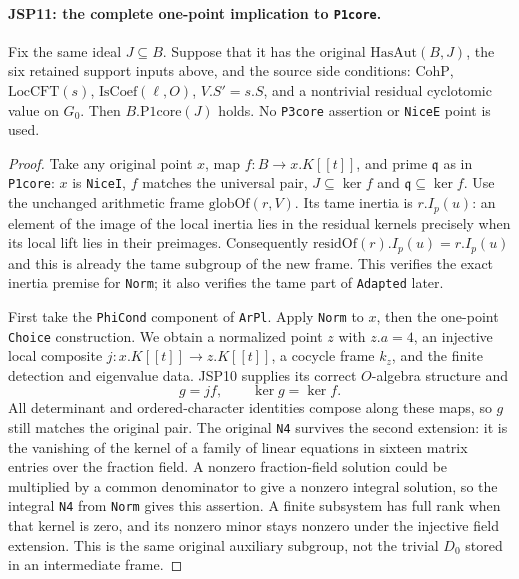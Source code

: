 \paragraph{JSP11: the complete one-point implication to \texttt{P1core}.}
\label{claim:JSP11}
Fix the same ideal $J\subseteq B$. Suppose that it has the
original $\mathrm{HasAut}(B,J)$, the six retained support
inputs above, and the source side conditions:
$\mathrm{CohP}$, $\mathrm{LocCFT}(s)$, $\mathrm{IsCoef}(\ell,O)$,
$V.S'=s.S$, and a nontrivial residual cyclotomic value on $G_0$.
Then $B.\mathrm{P1core}(J)$ holds. No \texttt{P3core}
assertion or \texttt{NiceE} point is used.
\begin{proof}
Take any original point $x$, map $f:B\to x.K[[t]]$, and
prime $\mathfrak q$ as in \texttt{P1core}: $x$ is
\texttt{NiceI}, $f$ matches the universal pair,
$J\subseteq\ker f$ and $\mathfrak q\subseteq\ker f$.
Use the unchanged arithmetic frame $\mathrm{globOf}(r,V)$.
Its tame inertia is $r.I_p(u)$: an element of the image of
the local inertia lies in the residual kernels precisely when
its local lift lies in their preimages. Consequently
$\mathrm{residOf}(r).I_p(u)=r.I_p(u)$ and this is already
the tame subgroup of the new frame. This verifies the exact
inertia premise for \texttt{Norm}; it also verifies the tame
part of \texttt{Adapted} later.

First take the \texttt{PhiCond} component of \texttt{ArPl}.
Apply \texttt{Norm} to $x$, then the one-point
\texttt{Choice} construction. We obtain a normalized point
$z$ with $z.a=4$, an injective local composite
$j:x.K[[t]]\to z.K[[t]]$, a cocycle frame $k_z$, and the
finite detection and eigenvalue data. JSP10 supplies its
correct $O$-algebra structure and
\[
                         g=jf,\qquad \ker g=\ker f.   \tag{JSP.17}
\]
All determinant and ordered-character identities compose
along these maps, so $g$ still matches the original pair.
The original \texttt{N4} survives the second extension:
it is the vanishing of the kernel of a family of linear
equations in sixteen matrix entries over the fraction field.
A nonzero fraction-field solution could be multiplied by a
common denominator to give a nonzero integral solution, so
the integral \texttt{N4} from \texttt{Norm} gives this assertion.
A finite subsystem has full rank when that kernel is zero,
and its nonzero minor stays nonzero under the injective
field extension. This is the same original auxiliary subgroup,
not the trivial $D_0$ stored in an intermediate frame.


\end{proof}
